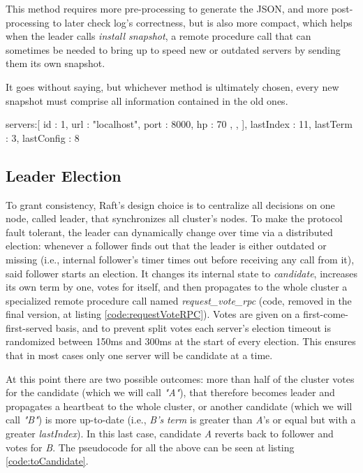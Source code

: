 This method requires more pre-processing to generate the JSON, and more post-processing to later check log's correctness, but is also more compact, which helps when the leader calls \textit{install snapshot}, a remote procedure call that can sometimes be needed to bring up to speed new or outdated servers by sending them its own snapshot. 

It goes without saying, but whichever method is ultimately chosen, every new snapshot must comprise all information contained in the old ones.

\begin{python}[label={code:snapJson}, caption={The JSON for a snapshot of the whole server would look something like this}]
{
    servers:[
        {
            id : 1,
            url : "localhost",
            port : 8000,
            hp : 70
        },
        {}, {}
    ],
    lastIndex : 11,
    lastTerm : 3,
    lastConfig : 8
}
\end{python}

\subsection{Leader Election}

To grant consistency, Raft's design choice is to centralize all decisions on one node, called leader, that synchronizes all cluster's nodes. To make the protocol fault tolerant, the leader can dynamically change over time via a distributed election: whenever a follower finds out that the leader is either outdated or missing (i.e., internal follower's timer times out before receiving any call from it), said follower starts an election. It changes its internal state to \textit{candidate}, increases its own term by one, votes for itself, and then propagates to the whole cluster a specialized remote procedure call named \textit{request\_vote\_rpc} (code, removed in the final version, at listing \ref{code:requestVoteRPC}). Votes are given on a first-come-first-served basis, and to prevent split votes each server's election timeout is randomized between 150ms and 300ms at the start of every election. This ensures that in most cases only one server will be candidate at a time.

At this point there are two possible outcomes: more than half of the cluster votes for the candidate (which we will call \textit{"A"}), that therefore becomes leader and propagates a heartbeat to the whole cluster, or another candidate (which we will call \textit{"B"}) is more up-to-date (i.e., \textit{B's} \textit{term} is greater than \textit{A}'s or equal but with a greater \textit{lastIndex}). In this last case, candidate \textit{A} reverts back to follower and votes for \textit{B}. The pseudocode for all the above can be seen at listing \ref{code:toCandidate}.


